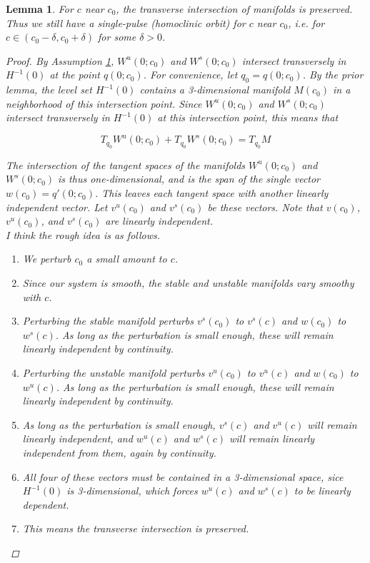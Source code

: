 \documentclass[12pt]{article}
\newtheorem{lemma}{Lemma}
\begin{document}
\begin{lemma}\label{transverseint}
For $c$ near $c_0$, the transverse intersection of manifolds is preserved. Thus we still have a single-pulse (homoclinic orbit) for $c$ near $c_0$, i.e. for $c \in (c_0 - \delta, c_0 + \delta)$ for some $\delta > 0$. 
\begin{proof}
By Assumption \ref{transverseint}, $W^u(0; c_0)$ and $W^s(0; c_0)$ intersect transversely in $H^{-1}(0)$ at the point $q(0; c_0)$. For convenience, let $q_0 = q(0; c_0)$. By the prior lemma, the level set $H^{-1}(0)$ contains a 3-dimensional manifold $M(c_0)$ in a neighborhood of this intersection point. Since $W^u(0; c_0)$ and $W^s(0; c_0)$ intersect transversely in $H^{-1}(0)$ at this intersection point, this means that

\[
T_{q_0} W^u(0; c_0) + T_{q_0} W^s(0; c_0) = T_{q_0} M
\]

The intersection of the tangent spaces of the manifolds $W^u(0; c_0)$ and $W^s(0; c_0)$ is thus one-dimensional, and is the span of the single vector $w(c_0) = q'(0; c_0)$. This leaves each tangent space with another linearly independent vector. Let $v^u(c_0)$ and $v^s(c_0)$ be these vectors. Note that $v(c_0)$, $v^u(c_0)$, and $v^s(c_0)$ are linearly independent.
\\

I think the rough idea is as follows.
\begin{enumerate}
	\item We perturb $c_0$ a small amount to $c$.
	\item Since our system is smooth, the stable and unstable manifolds vary smoothy with $c$. 
	\item Perturbing the stable manifold perturbs $v^s(c_0)$ to $v^s(c)$ and $w(c_0)$ to $w^s(c)$. As long as the perturbation is small enough, these will remain linearly independent by continuity.
	\item Perturbing the unstable manifold perturbs $v^u(c_0)$ to $v^u(c)$ and $w(c_0)$ to $w^u(c)$. As long as the perturbation is small enough, these will remain linearly independent by continuity.
	\item As long as the perturbation is small enough, $v^s(c)$ and $v^u(c)$ will remain linearly independent, and $w^u(c)$ and $w^s(c)$ will remain linearly independent from them, again by continuity.
	\item All four of these vectors must be contained in a 3-dimensional space, sice $H^{-1}(0)$ is 3-dimensional, which forces $w^u(c)$ and $w^s(c)$ to be linearly dependent.
	\item This means the transverse intersection is preserved.
\end{enumerate} 


\end{proof}
\end{lemma}
\end{document}
